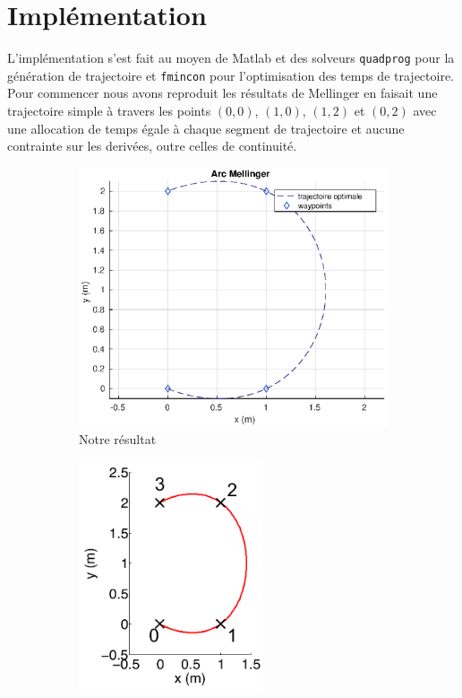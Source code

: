 \section{Implémentation}

L'implémentation s'est fait au moyen de Matlab et des solveurs \texttt{quadprog} pour la génération de trajectoire et \texttt{fmincon} pour l'optimisation des temps de trajectoire. Pour commencer nous avons reproduit les résultats de Mellinger en faisait une trajectoire simple à travers les points $(0,0)$, $(1,0)$, $(1,2)$ et $(0,2)$ avec une allocation de temps égale à chaque segment de trajectoire et aucune contrainte sur les derivées, outre celles de continuité.

\begin{figure}[h]
\centering
\begin{subfigure}{.5\textwidth}
  \centering
  \includegraphics[width=\textwidth]{fig/arc_mellinger}
  \caption{Notre résultat}
\end{subfigure}%
\begin{subfigure}{.5\textwidth}
  \centering
  \includegraphics[width=0.6\textwidth]{fig/arc_mellinger_orig.png}

\end{subfigure}
\end{figure}
